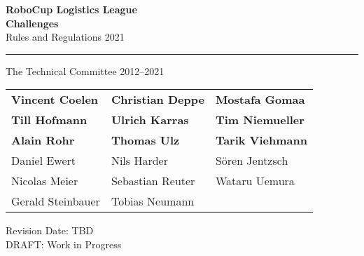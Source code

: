 \documentclass[12pt,twoside]{article}
\begin{document}
\begin{titlepage}
 \vspace*{5cm}
 \begin{center}
  \begin{LARGE}

   {\bf RoboCup Logistics League}\\[2ex]
   {\Large \bf{Challenges}}\\[4ex]
   {\Large Rules and Regulations 2021}\\[4ex]
  \end{LARGE}
  \hrule

  {\LARGE\vspace*{4ex}}
  \begin{Large}
   The Technical Committee 2012--2021\\[6ex]
  \end{Large}
  \begin{tabular}{lll}
   \textbf{Vincent Coelen}&\textbf{Christian Deppe}&\textbf{Mostafa Gomaa}\\
   \textbf{Till Hofmann}&\textbf{Ulrich Karras}&\textbf{Tim Niemueller}\\
   \textbf{Alain Rohr}&\textbf{Thomas Ulz}&\textbf{Tarik Viehmann}\\[.5em]

   Daniel Ewert&Nils Harder&S\"oren Jentzsch\\
   Nicolas Meier&Sebastian Reuter&Wataru Uemura\\
   Gerald Steinbauer&Tobias Neumann\\
  \end{tabular}
  \vfill
  Revision Date: \ac{TBD}\\
  DRAFT: Work in Progress %
 \end{center}
\end{titlepage}
\end{document}
